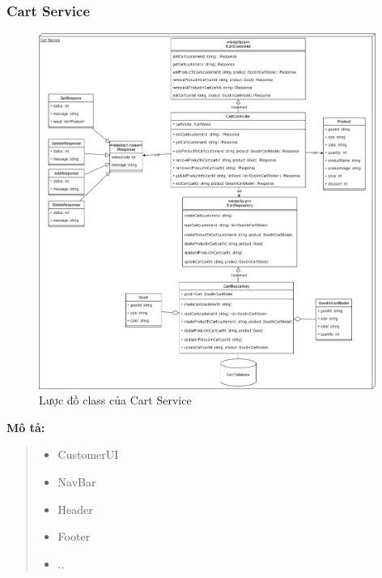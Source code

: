 \subsubsection{Cart Service}
\begin{figure}[!htp]
	\centering
	\includegraphics[width=11cm]{img/Architecture/service/CartService.png}
	\newline
	\caption{Lược đồ class của Cart Service}
\end{figure}
\textbf{Mô tả:}
\begin{quote}
	\begin{itemize}
		\item CustomerUI
		\item NavBar
		\item Header
		\item Footer
		\item ..
	\end{itemize}
\end{quote}


